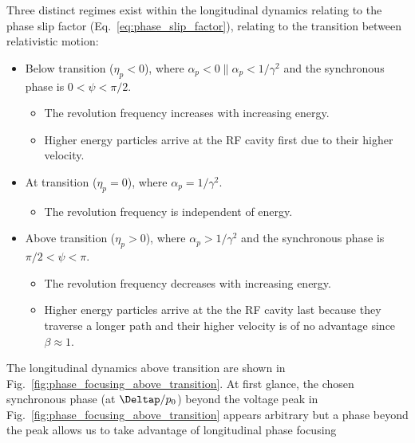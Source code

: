 \documentclass[../main.tex]{subfiles}
\begin{document}
Three distinct regimes exist within the longitudinal dynamics relating to the phase slip factor (Eq.~\ref{eq:phase_slip_factor}), relating to the transition between relativistic motion:
\begin{itemize}
    \item{Below transition ($\eta_{p}<0$), where $\alpha_{p}<0 \parallel \alpha_{p}<1/\gamma^{2}$ and the synchronous phase is $0<\psi<\pi/2$.
    \begin{itemize}
        \item{The revolution frequency increases with increasing energy.}
        \item{Higher energy particles arrive at the RF cavity first due to their higher velocity.}
    \end{itemize}}
    \item{At transition ($\eta_{p}=0$), where $\alpha_{p}=1/\gamma^{2}$.
    \begin{itemize}
        \item{The revolution frequency is independent of energy.} 
    \end{itemize}}
    \item{Above transition ($\eta_{p}>0$), where $\alpha_{p}>1/\gamma^{2}$ and the synchronous phase is $\pi/2<\psi<\pi$.
    \begin{itemize}
        \item{The revolution frequency decreases with increasing energy.}
        \item{Higher energy particles arrive at the the RF cavity last because they traverse a longer path and their higher velocity is of no advantage since $\beta\approx1$.}
    \end{itemize}}
\end{itemize}
The longitudinal dynamics above transition are shown in Fig.~\ref{fig:phase_focusing_above_transition}. At first glance, the chosen synchronous phase (at $\Deltap/p_{0}$) beyond the voltage peak in Fig.~\ref{fig:phase_focusing_above_transition} appears arbitrary but a phase beyond the peak allows us to take  advantage of longitudinal phase focusing
\end{document}

